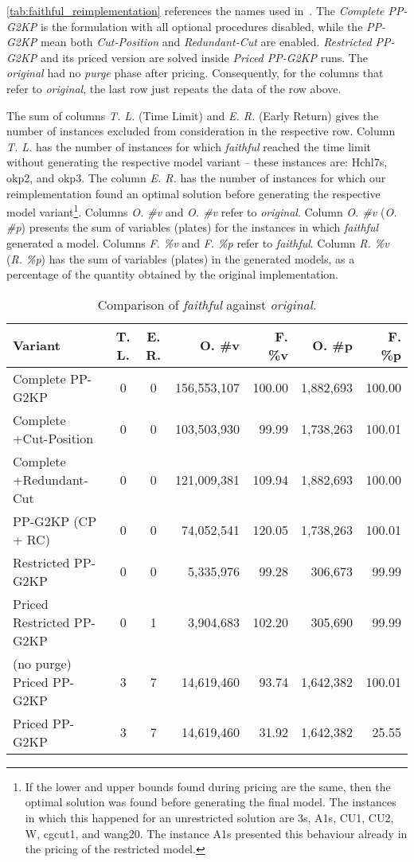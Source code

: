 \documentclass[smallextended]{svjour3}       %
\begin{document}
\autoref{tab:faithful_reimplementation} references the names used in~\cite{furini:2016,dimitri_thesis}.
The \emph{Complete PP-G2KP} is the formulation with all optional procedures disabled, while the \emph{PP-G2KP} mean both \emph{Cut-Position} and \emph{Redundant-Cut} are enabled.
\emph{Restricted PP-G2KP} and its priced version are solved inside \emph{Priced PP-G2KP} runs.
The \emph{original} had no \emph{purge} phase after pricing.
Consequently, for the columns that refer to \emph{original}, the last row just repeats the data of the row above.

The sum of columns \emph{T. L.} (Time Limit) and \emph{E. R.} (Early Return) gives the number of instances excluded from consideration in the respective row.
Column \emph{T. L.} has the number of instances for which \emph{faithful} reached the time limit without generating the respective model variant -- these instances are: Hchl7s, okp2, and okp3.
The column \emph{E. R.} has the number of instances for which our reimplementation found an optimal solution before generating the respective model variant\footnote{
	If the lower and upper bounds found during pricing are the same, then the optimal solution was found before generating the final model.
	The instances in which this happened for an unrestricted solution are 3s, A1s, CU1, CU2, W, cgcut1, and wang20.
	The instance A1s presented this behaviour already in the pricing of the restricted model.
}.
Columns \emph{O. \#v} and \emph{O. \#v} refer to \emph{original}.
Column \emph{O. \#v} (\emph{O. \#p}) presents the sum of variables (plates) for the instances in which \emph{faithful} generated a model.
Columns \emph{F. \%v} and \emph{F. \%p} refer to \emph{faithful}.
Column \emph{R. \%v} (\emph{R. \%p}) has the sum of variables (plates) in the generated models, as a percentage of the quantity obtained by the original implementation.

\begin{table}
\caption{Comparison of \emph{faithful} against \emph{original}.}
\begin{tabular}{lccrrrr}
\hline\hline
Variant & T. L. & E. R. & O. \#v & F. \%v & O. \#p & F. \%p\\\hline
Complete PP-G2KP & 0 & 0 & 156,553,107 & 100.00 & 1,882,693 & 100.00\\
Complete +Cut-Position & 0 & 0 & 103,503,930 & 99.99 & 1,738,263 & 100.01\\
Complete +Redundant-Cut & 0 & 0 & 121,009,381 & 109.94 & 1,882,693 & 100.00\\
PP-G2KP (CP + RC) & 0 & 0 & 74,052,541 & 120.05 & 1,738,263 & 100.01\\
Restricted PP-G2KP & 0 & 0 & 5,335,976 & 99.28 & 306,673 & 99.99\\
Priced Restricted PP-G2KP & 0 & 1 & 3,904,683 & 102.20 & 305,690 & 99.99\\
(no purge) Priced PP-G2KP & 3 & 7 & 14,619,460 & 93.74 & 1,642,382 & 100.01\\
Priced PP-G2KP & 3 & 7 & 14,619,460 & 31.92 & 1,642,382 & 25.55\\\hline\hline
\end{tabular}
\label{tab:faithful_reimplementation}
\end{table}
\end{document}
